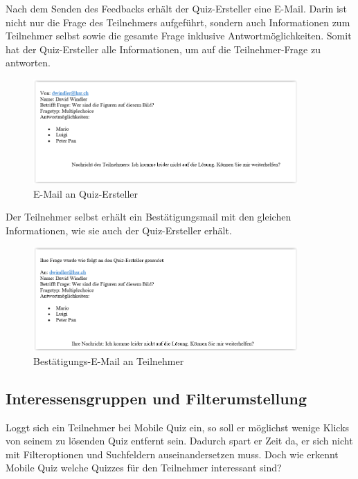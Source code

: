 Nach dem Senden des Feedbacks erhält der Quiz-Ersteller eine E-Mail. Darin ist nicht nur die Frage des Teilnehmers aufgeführt, sondern auch Informationen zum Teilnehmer selbst sowie die gesamte Frage inklusive Antwortmöglichkeiten. Somit hat der Quiz-Ersteller alle Informationen, um auf die Teilnehmer-Frage zu antworten.

\begin{figure}[H]
	\centering
	\includegraphics[width=0.9\textwidth]{Images/Feedback-Mail_Quiz-Ersteller.PNG}
	\caption{E-Mail an Quiz-Ersteller}
\end{figure}

Der Teilnehmer selbst erhält ein Bestätigungsmail mit den gleichen Informationen, wie sie auch der Quiz-Ersteller erhält.

\begin{figure}[H]
	\centering
	\includegraphics[width=0.9\textwidth]{Images/Feedback-Mail_Teilnehmer.PNG}
	\caption{Bestätigungs-E-Mail an Teilnehmer}
\end{figure}




\subsection{Interessensgruppen und Filterumstellung}
Loggt sich ein Teilnehmer bei Mobile Quiz ein, so soll er möglichst wenige Klicks von seinem zu lösenden Quiz entfernt sein. Dadurch spart er Zeit da, er sich nicht mit Filteroptionen und Suchfeldern auseinandersetzen muss. Doch wie erkennt Mobile Quiz welche Quizzes für den Teilnehmer interessant sind?

